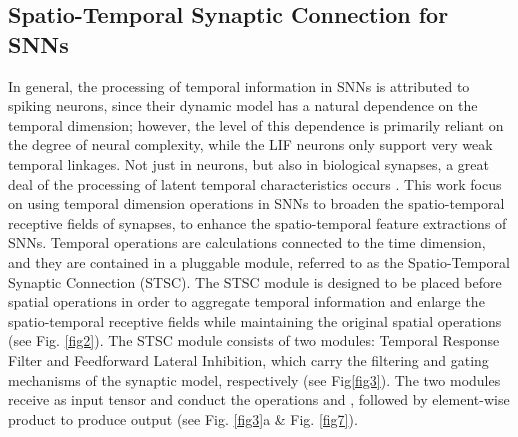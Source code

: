 \documentclass[letterpaper]{article} \usepackage[submission]{aaai23}  \usepackage{times}  \usepackage{helvet}  \usepackage{courier}  \usepackage[hyphens]{url}  \usepackage{graphicx} \urlstyle{rm} \def\UrlFont{\rm}  \usepackage{natbib}  \usepackage{caption} \frenchspacing  \setlength{\pdfpagewidth}{8.5in} \setlength{\pdfpageheight}{11in} \usepackage{algorithm}
\begin{document}
\subsection{Spatio-Temporal Synaptic Connection for SNNs}
In general, the processing of temporal information in SNNs is attributed to spiking neurons, since their dynamic model has a natural dependence on the temporal dimension; however, the level of this dependence is primarily reliant on the degree of neural complexity, while the LIF neurons only support very weak temporal linkages.
Not just in neurons, but also in biological synapses, a great deal of the processing of latent temporal characteristics occurs \cite{luo_architectures_nodate,letellier_differential_2019}.
This work focus on using temporal dimension operations in SNNs to broaden the spatio-temporal receptive fields of synapses, to enhance the spatio-temporal feature extractions of SNNs.
Temporal operations are calculations connected to the time dimension, and they are contained in a pluggable module, referred to as the Spatio-Temporal Synaptic Connection (STSC). The STSC module is designed to be placed before spatial operations in order to aggregate  temporal information and enlarge the spatio-temporal receptive fields while maintaining the original spatial operations (see Fig. \ref{fig2}).
The STSC module consists of two modules: Temporal Response Filter and Feedforward Lateral Inhibition, which carry the filtering and gating mechanisms of the synaptic model, respectively (see Fig\ref{fig3}). The two modules receive  as input tensor and conduct the operations  and , followed by element-wise product to produce output  (see Fig. \ref{fig3}a \& Fig. \ref{fig7}).
\end{document}
